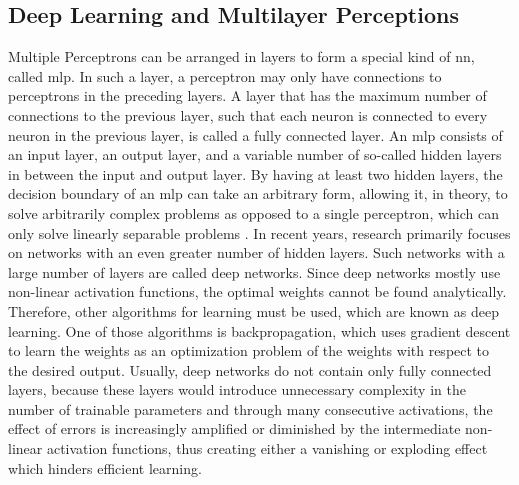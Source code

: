 \subsection{Deep Learning and Multilayer Perceptions}
Multiple Perceptrons can be arranged in layers to form a special kind of \ac{nn}, called \ac{mlp}. In such a layer, a perceptron may only have connections to perceptrons in the preceding layers. A layer that has the maximum number of connections to the previous layer, such that each neuron is connected to every neuron in the previous layer, is called a fully connected layer. An \ac{mlp} consists of an input layer, an output layer, and a variable number of so-called hidden layers in between the input and output layer. By having at least two hidden layers, the decision boundary of an \ac{mlp} can take an arbitrary form, allowing it, in theory, to solve arbitrarily complex problems as opposed to a single perceptron, which can only solve linearly separable problems \cite{Lapedes1988}. In recent years, research primarily focuses on networks with an even greater number of hidden layers. Such networks with a large number of layers are called deep networks. Since deep networks mostly use non-linear activation functions, the optimal weights cannot be found analytically. Therefore, other algorithms for learning must be used, which are known as deep learning. One of those algorithms is backpropagation, which uses gradient descent to learn the weights as an optimization problem of the weights with respect to the desired output. Usually, deep networks do not contain only fully connected layers, because these layers would introduce unnecessary complexity in the number of trainable parameters and through many consecutive activations, the effect of errors is increasingly amplified or diminished by the intermediate non-linear activation functions, thus creating either a vanishing or exploding effect which hinders efficient learning\cite{Hanin2018}.

